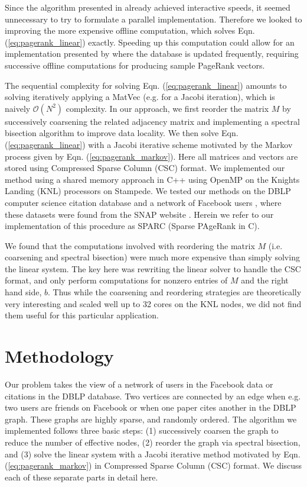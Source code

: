 \documentclass[11pt]{article}
\begin{document}
Since the algorithm presented in \cite{xie} already achieved interactive speeds, it seemed
unnecessary to try to formulate a parallel implementation. Therefore we looked
to improving the more expensive offline computation, which solves Eqn.
(\ref{eq:pagerank_linear}) exactly. Speeding up this computation could allow for
an implementation presented by \cite{xie} where the database is updated
frequently, requiring successive offline computations for producing sample
PageRank vectors.

The sequential complexity for solving Eqn. (\ref{eq:pagerank_linear}) amounts to
solving iteratively applying a MatVec (e.g. for a Jacobi iteration), which is
naively $\mathcal{O}(N^2)$ complexity. In our approach, we first reorder the
matrix $M$ by successively coarsening the related adjacency matrix and
implementing a spectral bisection algorithm to improve data locality. We then
solve Eqn. (\ref{eq:pagerank_linear}) with a Jacobi iterative scheme motivated
by the Markov process given by Eqn. (\ref{eq:pagerank_markov}). Here all
matrices and vectors are stored using Compressed Sparse Column (CSC) format. We
implemented our method using a shared memory approach in C++ using OpenMP on the Knights Landing (KNL) processors on
Stampede. We tested our methods on the DBLP computer science citation database
\cite{dblp} and a network of Facebook users \cite{facebook}, where these
datasets were found from the SNAP website \cite{snapnets}. Herein we refer to
our implementation of this procedure as {\rm SPARC} (Sparse PAgeRank in C).

We found that the computations involved with reordering the matrix $M$ (i.e.
coarsening and spectral bisection) were much more expensive than simply solving
the linear system. The key here was rewriting the linear solver to handle the
CSC format, and only perform computations for nonzero entries of $M$ and the right hand
side, $b$. Thus while the coarsening and reordering strategies are theoretically
very interesting and scaled well up to 32 cores on the KNL nodes, 
we did not find them useful for this particular application. 



\section{Methodology}

Our problem takes the view of a network of users in the Facebook data or
citations in the DBLP database. Two vertices are connected by an edge when e.g. two
users are friends on Facebook or when one paper cites another in the DBLP graph.
These graphs are highly sparse, and randomly ordered.
The algorithm we implemented follows three basic steps: (1) successively coarsen
the graph to reduce the number of effective nodes, (2) reorder the graph via
spectral bisection, and (3) solve the linear system with a Jacobi iterative
method motivated by Eqn. (\ref{eq:pagerank_markov}) in Compressed Sparse
Column (CSC) format. We discuss each of these separate parts in detail here. 
\end{document}
